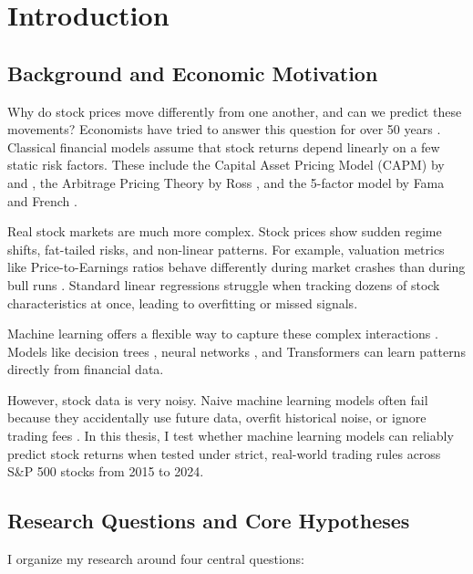 \chapter{Introduction}
\label{ch:introduction}

\section{Background and Economic Motivation}
Why do stock prices move differently from one another, and can we predict these movements? Economists have tried to answer this question for over 50 years \citep{fama1970efficient, fama1993common}. Classical financial models assume that stock returns depend linearly on a few static risk factors. These include the Capital Asset Pricing Model (CAPM) by \citet{sharpe1964capital} and \citet{lintner1965valuation}, the Arbitrage Pricing Theory by Ross \citeyearpar{ross1976arbitrage}, and the 5-factor model by Fama and French \citeyearpar{fama2015five}.

Real stock markets are much more complex. Stock prices show sudden regime shifts, fat-tailed risks, and non-linear patterns. For example, valuation metrics like Price-to-Earnings ratios behave differently during market crashes than during bull runs \citep{gu2020empirical, kozak2020shrinking}. Standard linear regressions struggle when tracking dozens of stock characteristics at once, leading to overfitting or missed signals.

Machine learning offers a flexible way to capture these complex interactions \citep{gu2020empirical, chen2023deep, kozak2020shrinking}. Models like decision trees \citep{breiman2001random, chen2016xgboost}, neural networks \citep{bai2018empirical}, and Transformers \citep{vaswani2017attention} can learn patterns directly from financial data.

However, stock data is very noisy. Naive machine learning models often fail because they accidentally use future data, overfit historical noise, or ignore trading fees \citep{harvey2016and, novy2016taxonomy, lopez2018advances}. In this thesis, I test whether machine learning models can reliably predict stock returns when tested under strict, real-world trading rules across S\&P 500 stocks from 2015 to 2024.

\section{Research Questions and Core Hypotheses}
I organize my research around four central questions:

